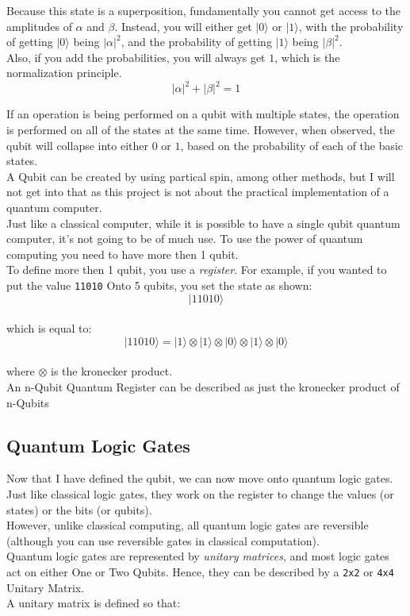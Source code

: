 \documentclass[../main.tex]{subfiles}
\begin{document}
Because this state is a superposition, fundamentally you cannot get
access to the amplitudes of \(\alpha\) and \(\beta\).
Instead, you will either get \(\lvert0\rangle\) or \(\lvert1\rangle\), with the
probability of getting \(\lvert0\rangle\) being \(\lvert\alpha\lvert^2\), and the
probability of getting \(\lvert1\rangle\) being \(\lvert\beta\lvert^2\).\\
Also, if you add the probabilities, you will always get \(1\), which is
the normalization principle.\\
\begin{equation}
	\lvert\alpha\lvert^2 + \lvert\beta\lvert^2 = 1
\end{equation}

If an operation is being performed on a qubit with multiple states, the
operation is performed on all of the states at the same time. However,
when observed, the qubit will collapse into either \(0\) or \(1\),
based on the probability of each of the basic states.\\
A Qubit can be created by using partical spin, among other methods, but
I will not get into that as this project is not about the practical
implementation of a quantum computer.\\

Just like a classical computer, while it is possible to have a single
qubit quantum computer, it's not going to be of much use. To use the power
of quantum computing you need to have more then 1 qubit.\\
To define more then 1 qubit, you use a \emph{register}. For example, if
you wanted to put the value \texttt{11010} Onto 5 qubits, you set the
state as shown:\\
\[
\lvert11010\rangle\]\\
which is equal to:\\
\[
\lvert11010\rangle = \lvert1\rangle \otimes \lvert1\rangle \otimes \lvert0\rangle \otimes \lvert1\rangle \otimes \lvert0\rangle\]\\
where \(\otimes\) is the kronecker product.\\
An n-Qubit Quantum Register can be described as just the kronecker product of n-Qubits\\

\subsection{Quantum Logic Gates}

Now that I have defined the qubit, we can now move onto quantum logic
gates.\\
Just like classical logic gates, they work on the register to change the
values (or states) or the bits (or qubits).\\
However, unlike classical computing, all quantum logic gates are
reversible (although you can use reversible gates in classical
computation).\\
Quantum logic gates are represented by \emph{unitary matrices}, and most
logic gates act on either One or Two Qubits. Hence, they can be
described by a \texttt{2x2} or \texttt{4x4} Unitary Matrix.\\
A unitary matrix is defined so that:
\end{document}
